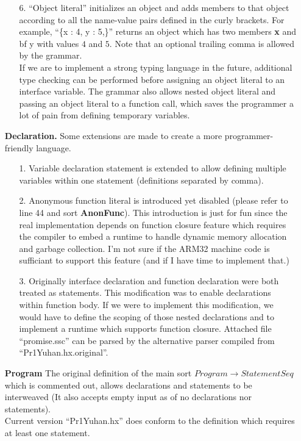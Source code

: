 \documentclass[12pt]{article}
\begin{document}
\begin{center}
\begin{itemize}
\begin{itemize}
  \item[6.] ``Object literal'' initializes an object and adds members to that object according
    to all the name-value pairs defined in the curly brackets. For example, ``\{x : 4, y : 5,\}''
    returns an object which has two members {\bf x} and {bf y} with values $4$ and $5$. Note that
    an optional trailing comma is allowed by the grammar.\\
    If we are to implement a strong typing language in the future, additional type checking can
    be performed before assigning an object literal to an interface variable. The grammar also
    allows nested object literal and passing an object literal to a function call, which saves
    the programmer a lot of pain from defining temporary variables.
  \end{itemize}
\item[{\bf Declaration.}] Some extensions are made to create a more programmer-friendly language.
  \begin{itemize}
  \item[1.] Variable declaration statement is extended to allow defining multiple variables
    within one statement (definitions separated by comma).
  \item[2.] Anonymous function literal is introduced yet disabled (please refer to line 44 and sort
    {\bf AnonFunc}). This introduction is just for fun since the real implementation depends on function
    closure feature which requires the compiler to embed a runtime to handle dynamic memory allocation
    and garbage collection. I'm not sure if the ARM32 machine code is sufficiant to support this feature
    (and if I have time to implement that.)
  \item[3.] Originally interface declaration and function declaration were both treated as statements.
    This modification was to enable declarations within function body. If we were to implement this
    modification, we would have to define the scoping of those nested declarations and to implement
    a runtime which supports function closure. Attached file ``promise.ssc'' can be parsed by the
    alternative parser compiled from ``Pr1Yuhan.hx.original''.
  \end{itemize}
\item[{\bf Program}] The original definition of the main sort $Program \rightarrow StatementSeq$
  which is commented out, allows declarations and statements to be interweaved (It also accepts
  empty input as of no declarations nor statements).\\
  Current version ``Pr1Yuhan.hx'' does conform to the definition which requires at least one statement.
\end{itemize}
\end{center}
\end{document}

